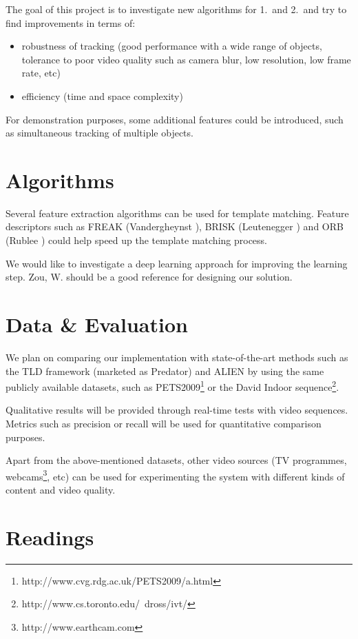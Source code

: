 \documentclass[10pt,twocolumn,letterpaper]{article}
\begin{document}
The goal of this project is to investigate new algorithms for 1.\ and 2.\ and try to find improvements in terms of:
\begin{itemize}
\item
robustness of tracking (good performance with a wide range of objects, tolerance to poor video quality such as camera blur, low resolution, low frame rate, etc)
\item
efficiency (time and space complexity)
\end{itemize}
For demonstration purposes, some additional features could be introduced, such as simultaneous tracking of multiple objects.

\section{Algorithms}

Several feature extraction algorithms can be used for template matching. Feature descriptors such as FREAK (Vandergheynst \etal\cite{vandergheynst2012freak}), BRISK (Leutenegger \etal\cite{leutenegger2011brisk}) and ORB (Rublee \etal\cite{rublee2011orb}) could help speed up the template matching process.

We would like to investigate a deep learning approach for improving the learning step. Zou, W. \cite{zou} should be a good reference for designing our solution.

\section{Data \& Evaluation}

We plan on comparing our implementation with state-of-the-art methods such as the TLD framework \cite{kalal2012tracking} (marketed as Predator) and ALIEN \cite{pernicifacehugger} by using the same publicly available datasets, such as PETS2009\footnote{http://www.cvg.rdg.ac.uk/PETS2009/a.html} or the David Indoor sequence\footnote{http://www.cs.toronto.edu/~dross/ivt/}.

Qualitative results will be provided through real-time tests with video sequences. Metrics such as precision or recall will be used for quantitative comparison purposes.

Apart from the above-mentioned datasets, other video sources (TV programmes, webcams\footnote{http://www.earthcam.com}, etc) can be used for experimenting the system with different kinds of content and video quality.

\section{Readings}
\end{document}

